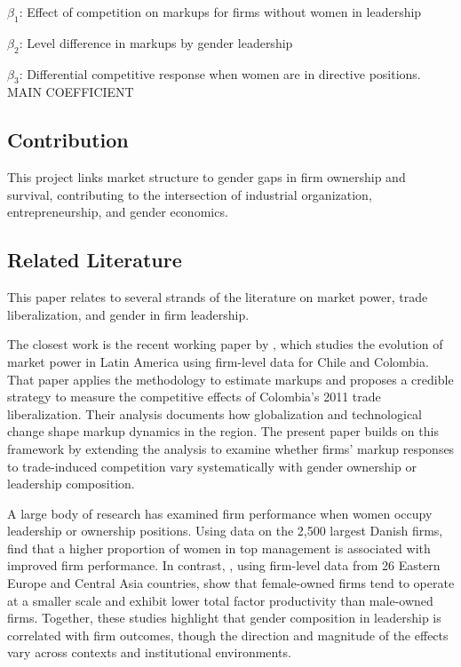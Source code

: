 \documentclass[11pt]{article}
\begin{document}
$\beta_{1}$: Effect of competition on markups for firms without women in leadership

$\beta_{2}$: Level difference in markups by gender leadership

$\beta_{3}$: Differential competitive response when women are in directive positions. MAIN COEFFICIENT

\subsection*{Contribution}
This project links market structure to gender gaps in firm ownership and survival, contributing to the intersection of industrial organization, entrepreneurship, and gender economics.

\subsection*{Related Literature}
This paper relates to several strands of the literature on market power, trade liberalization, and gender in firm leadership.

The closest work is the recent working paper by \cite{bracco_globalization_2025}, which studies the evolution of market power in Latin America using firm-level data for Chile and Colombia. That paper applies the \cite{loecker_markups_2012} methodology to estimate markups and proposes a credible strategy to measure the competitive effects of Colombia's 2011 trade liberalization. Their analysis documents how globalization and technological change shape markup dynamics in the region. The present paper builds on this framework by extending the analysis to examine whether firms' markup responses to trade-induced competition vary systematically with gender ownership or leadership composition.

A large body of research has examined firm performance when women occupy leadership or ownership positions. Using data on the 2,500 largest Danish firms, \cite{smith_women_2006} find that a higher proportion of women in top management is associated with improved firm performance. In contrast, \cite{shwetlena___2008}, using firm-level data from 26 Eastern Europe and Central Asia countries, show that female-owned firms tend to operate at a smaller scale and exhibit lower total factor productivity than male-owned firms. Together, these studies highlight that gender composition in leadership is correlated with firm outcomes, though the direction and magnitude of the effects vary across contexts and institutional environments.
\end{document}
